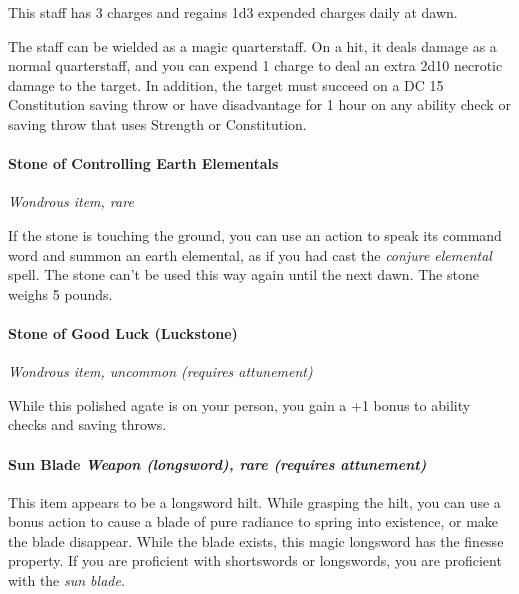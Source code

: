 \documentclass[
]{article}
\begin{document}
This staff has 3 charges and regains 1d3 expended charges daily at dawn.

The staff can be wielded as a magic quarterstaff. On a hit, it deals
damage as a normal quarterstaff, and you can expend 1 charge to deal an
extra 2d10 necrotic damage to the target. In addition, the target must
succeed on a DC 15 Constitution saving throw or have disadvantage for 1
hour on any ability check or saving throw that uses Strength or
Constitution.

\hypertarget{stone-of-controlling-earth-elementals}{%
\paragraph{Stone of Controlling Earth
Elementals}\label{stone-of-controlling-earth-elementals}}

\emph{Wondrous item, rare}

If the stone is touching the ground, you can use an action to speak its
command word and summon an earth elemental, as if you had cast the
\emph{conjure elemental} spell. The stone can't be used this way again
until the next dawn. The stone weighs 5 pounds.

\hypertarget{stone-of-good-luck-luckstone}{%
\paragraph{Stone of Good Luck
(Luckstone)}\label{stone-of-good-luck-luckstone}}

\emph{Wondrous item, uncommon (requires attunement)}

While this polished agate is on your person, you gain a +1 bonus to
ability checks and saving throws.

\hypertarget{sun-blade-weapon-longsword-rare-requires-attunement}{%
\paragraph{\texorpdfstring{Sun Blade \emph{Weapon (longsword), rare
(requires
attunement)}}{Sun Blade Weapon (longsword), rare (requires attunement)}}\label{sun-blade-weapon-longsword-rare-requires-attunement}}

This item appears to be a longsword hilt. While grasping the hilt, you
can use a bonus action to cause a blade of pure radiance to spring into
existence, or make the blade disappear. While the blade exists, this
magic longsword has the finesse property. If you are proficient with
shortswords or longswords, you are proficient with the \emph{sun blade}.
\end{document}

